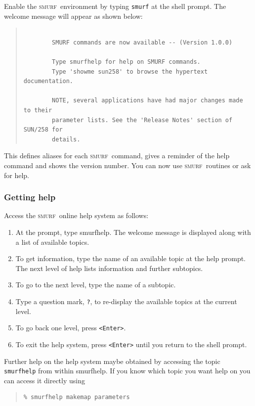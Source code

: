 \documentclass[twoside,11pt]{article}
\newcommand{\xref}[3]{#1}
\renewcommand{\_}{\texttt{\symbol{95}}}
\newenvironment{myquote}{\begin{quote}\begin{small}}{\end{small}\end{quote}}
\newcommand{\SMURF}{\textsc{smurf}}
\newcommand{\task}[1]{\textsf{#1}}
\newcommand{\smurfhelp}{\xref{\task{smurfhelp}}{sun258}{SMURFHELP}}
\begin{document}
Enable the \SMURF\ environment by typing \verb+smurf+ at the shell
prompt. The welcome message will appear as shown below:
\begin{myquote}
\begin{verbatim}

        SMURF commands are now available -- (Version 1.0.0)

        Type smurfhelp for help on SMURF commands.
        Type 'showme sun258' to browse the hypertext documentation.

        NOTE, several applications have had major changes made to their
        parameter lists. See the 'Release Notes' section of SUN/258 for
        details.

\end{verbatim}
\end{myquote}
This defines aliases for each \SMURF\ command, gives a reminder of the
help command and shows the version number. You can now use \SMURF\
routines or ask for help.

\subsubsection{Getting help}

Access the \SMURF\ online help system as follows:
\begin{enumerate}
\item At the prompt, type \smurfhelp. The welcome message is
  displayed along with a list of available topics.
\item To get information, type the name of an available topic at the
  help prompt.  The next level of help lists information and further
  subtopics.
\item To go to the next level, type the name of a subtopic.
\item Type a question mark, \verb+?+, to re-display the available
  topics at the current level.
\item To go back one level, press \verb+<Enter>+.
\item To exit the help system, press \verb+<Enter>+ until you return
  to the shell prompt.
\end{enumerate}
Further help on the help system maybe obtained by accessing the topic
\verb+smurfhelp+ from within \smurfhelp. If you know which topic you
want help on you can access it directly using

\begin{myquote}
\begin{verbatim}
% smurfhelp makemap parameters
\end{verbatim}
\end{myquote}
\end{document}
